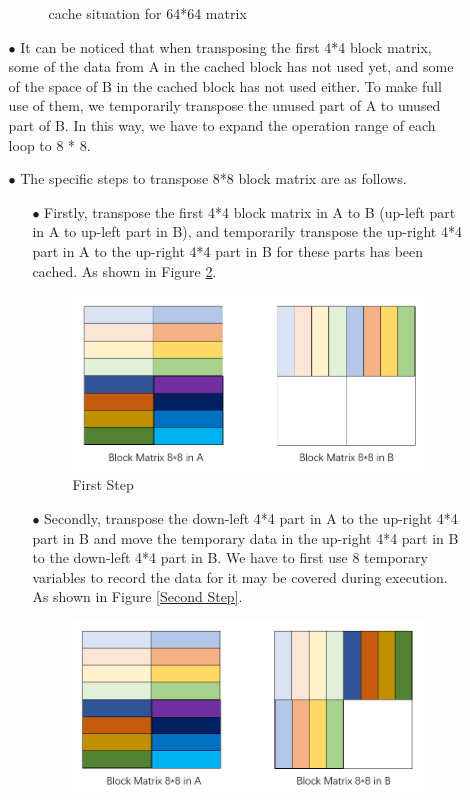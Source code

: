 \documentclass{article}
\begin{document}
\begin{itemize}
\begin{itemize}
\begin{figure}[htbp]
		\caption{cache situation for 64*64 matrix} \label{cache situation for 64*64 matrix}
\end{figure}
\item[$\bullet$]It can be noticed that when transposing the first 4*4 block matrix, some of the data from A in the cached block has not used yet, and some of the space of B in the cached block has not used either. To make full use of them, we temporarily transpose the unused part of A to unused part of B. In this way, we have to expand the operation range of each loop to 8 * 8.
\item[$\bullet$]The specific steps to transpose 8*8 block matrix are as follows.
\begin{itemize}
\item[$\bullet$]Firstly, transpose the first 4*4 block matrix in A to B (up-left part in A to up-left part in B), and temporarily transpose the up-right 4*4 part in A to the up-right 4*4 part in B for these parts has been cached. As shown in Figure \ref{First Step}.
\begin{figure}[htbp]
		\centering
		\includegraphics[scale=0.7]{S1}
		\caption{First Step} \label{First Step}
\end{figure}
\item[$\bullet$]Secondly, transpose the down-left 4*4 part in A to the up-right 4*4 part in B and move the temporary data in the up-right 4*4 part in B to the down-left 4*4 part in B. We have to first use 8 temporary variables to record the data for it may be covered during execution. As shown in Figure \ref{Second Step}.
\begin{figure}[htbp]
		\centering
		\includegraphics[scale=0.7]{S2}

\end{figure}
\end{itemize}
\end{itemize}
\end{itemize}
\end{document}
